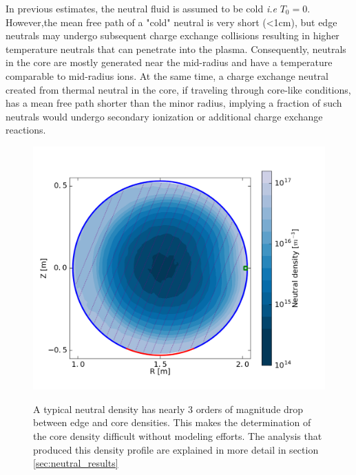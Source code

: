 \begin{refsection}
In previous estimates, the neutral fluid is assumed to be cold \textit{i.e} $T_0 = 0$. However,the mean free path of a "cold" neutral is very short (<1cm), but edge neutrals may undergo subsequent charge exchange collisions resulting in higher temperature neutrals that can penetrate into the plasma. Consequently, neutrals in the core are mostly generated near the mid-radius and have a temperature comparable to mid-radius ions. At the same time, a charge exchange neutral created from thermal neutral in the core, if traveling through core-like conditions, has a mean free path
shorter than the minor radius, implying a fraction of such neutrals would undergo secondary ionization or additional charge exchange reactions. 

\begin{figure}[!htb]
	\centering
	\includegraphics{./transport_modeling/neutral_n.png}
    \label{fig:n_n_0}
    \caption[Typical neutral density profile]{A typical neutral density has nearly 3 orders of magnitude drop between edge and core densities. This makes the determination of the core density difficult without modeling efforts. The analysis that produced this density profile are explained in more detail in section \ref{sec:neutral_results}}
\end{figure}%


\end{refsection}
